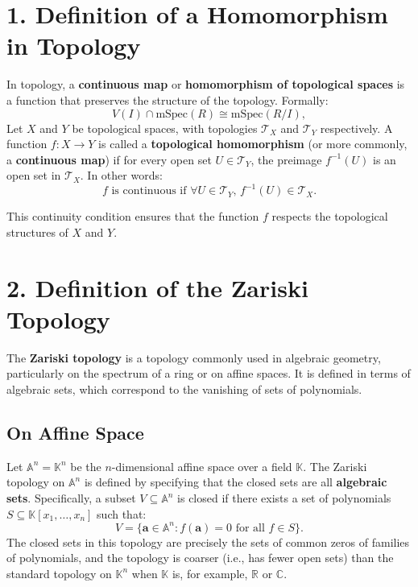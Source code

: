 \documentclass[11pt,openany]{article}
\begin{document}
\newpage
\section*{1. Definition of a Homomorphism in Topology}

In topology, a \textbf{continuous map} or \textbf{homomorphism of topological spaces} is a function that preserves the structure of the topology. Formally:
\[
V(I) \cap \text{mSpec}(R) \cong \text{mSpec}(R/I),
\]
Let \( X \) and \( Y \) be topological spaces, with topologies \( \mathcal{T}_X \) and \( \mathcal{T}_Y \) respectively. A function \( f: X \to Y \) is called a \textbf{topological homomorphism} (or more commonly, a \textbf{continuous map}) if for every open set \( U \in \mathcal{T}_Y \), the preimage \( f^{-1}(U) \) is an open set in \( \mathcal{T}_X \). In other words:
\[
f \text{ is continuous if } \forall U \in \mathcal{T}_Y, \, f^{-1}(U) \in \mathcal{T}_X.
\]

This continuity condition ensures that the function \( f \) respects the topological structures of \( X \) and \( Y \).

\section*{2. Definition of the Zariski Topology}

The \textbf{Zariski topology} is a topology commonly used in algebraic geometry, particularly on the spectrum of a ring or on affine spaces. It is defined in terms of algebraic sets, which correspond to the vanishing of sets of polynomials.

\subsection*{On Affine Space}

Let \( \mathbb{A}^n = \mathbb{K}^n \) be the \( n \)-dimensional affine space over a field \( \mathbb{K} \). The Zariski topology on \( \mathbb{A}^n \) is defined by specifying that the closed sets are all \textbf{algebraic sets}. Specifically, a subset \( V \subseteq \mathbb{A}^n \) is closed if there exists a set of polynomials \( S \subseteq \mathbb{K}[x_1, \dots, x_n] \) such that:
\[
V = \{ \mathbf{a} \in \mathbb{A}^n : f(\mathbf{a}) = 0 \text{ for all } f \in S \}.
\]
The closed sets in this topology are precisely the sets of common zeros of families of polynomials, and the topology is coarser (i.e., has fewer open sets) than the standard topology on \( \mathbb{K}^n \) when \( \mathbb{K} \) is, for example, \( \mathbb{R} \) or \( \mathbb{C} \).
\end{document}
